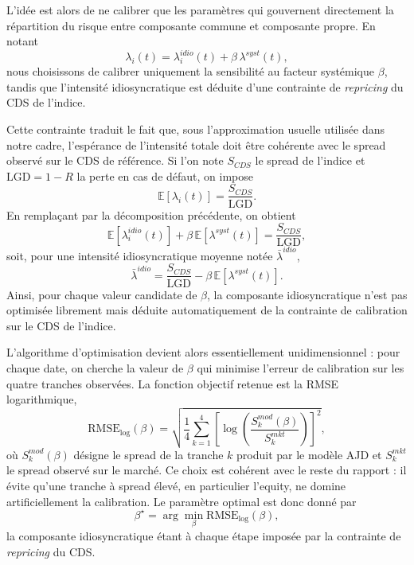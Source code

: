 L'idée est alors de ne calibrer que les paramètres qui gouvernent directement la répartition du risque entre composante commune et composante propre. En notant
\begin{equation}
\lambda_i(t)=\lambda_i^{idio}(t)+\beta\,\lambda^{syst}(t),
\end{equation}
nous choisissons de calibrer uniquement la sensibilité au facteur systémique $\beta$, tandis que l'intensité idiosyncratique est déduite d'une contrainte de \textit{repricing} du CDS de l'indice.

Cette contrainte traduit le fait que, sous l'approximation usuelle utilisée dans notre cadre, l'espérance de l'intensité totale doit être cohérente avec le spread observé sur le CDS de référence. Si l'on note $S_{CDS}$ le spread de l'indice et $\mathrm{LGD}=1-R$ la perte en cas de défaut, on impose
\begin{equation}
\mathbb{E}\!\left[\lambda_i(t)\right]=\frac{S_{CDS}}{\mathrm{LGD}}.
\end{equation}
En remplaçant par la décomposition précédente, on obtient
\begin{equation}
\mathbb{E}\!\left[\lambda_i^{idio}(t)\right]+\beta\,\mathbb{E}\!\left[\lambda^{syst}(t)\right]
=
\frac{S_{CDS}}{\mathrm{LGD}},
\end{equation}
soit, pour une intensité idiosyncratique moyenne notée $\bar{\lambda}^{idio}$,
\begin{equation}
\bar{\lambda}^{idio}
=
\frac{S_{CDS}}{\mathrm{LGD}}
-
\beta\,\mathbb{E}\!\left[\lambda^{syst}(t)\right].
\end{equation}
Ainsi, pour chaque valeur candidate de $\beta$, la composante idiosyncratique n'est pas optimisée librement mais déduite automatiquement de la contrainte de calibration sur le CDS de l'indice.

L'algorithme d'optimisation devient alors essentiellement unidimensionnel : pour chaque date, on cherche la valeur de $\beta$ qui minimise l'erreur de calibration sur les quatre tranches observées. La fonction objectif retenue est la RMSE logarithmique,
\begin{equation}
\mathrm{RMSE}_{\log}(\beta)
=
\sqrt{
\frac{1}{4}
\sum_{k=1}^{4}
\left[
\log\!\left(
\frac{S_k^{mod}(\beta)}{S_k^{mkt}}
\right)
\right]^2
},
\end{equation}
où $S_k^{mod}(\beta)$ désigne le spread de la tranche $k$ produit par le modèle AJD et $S_k^{mkt}$ le spread observé sur le marché. Ce choix est cohérent avec le reste du rapport : il évite qu'une tranche à spread élevé, en particulier l'equity, ne domine artificiellement la calibration. Le paramètre optimal est donc donné par
\begin{equation}
\beta^\star
=
\arg\min_{\beta}\mathrm{RMSE}_{\log}(\beta),
\end{equation}
la composante idiosyncratique étant à chaque étape imposée par la contrainte de \textit{repricing} du CDS.
